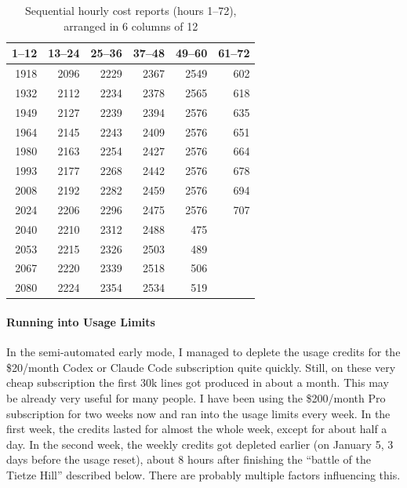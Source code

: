 \documentclass[a4paper,UKenglish,cleveref, autoref, thm-restate]{lipics-v2021}
\begin{document}
%

\begin{table}[h]
\centering
\small
\setlength{\tabcolsep}{4pt}
\begin{tabular}{rrrrrr}
\toprule
1--12 & 13--24 & 25--36 & 37--48 & 49--60 & 61--72 \\
\midrule
1918 & 2096 & 2229 & 2367 & 2549 & 602 \\
1932 & 2112 & 2234 & 2378 & 2565 & 618 \\
1949 & 2127 & 2239 & 2394 & 2576 & 635 \\
1964 & 2145 & 2243 & 2409 & 2576 & 651 \\
1980 & 2163 & 2254 & 2427 & 2576 & 664 \\
1993 & 2177 & 2268 & 2442 & 2576 & 678 \\
2008 & 2192 & 2282 & 2459 & 2576 & 694 \\
2024 & 2206 & 2296 & 2475 & 2576 & 707 \\
2040 & 2210 & 2312 & 2488 & 475  &      \\
2053 & 2215 & 2326 & 2503 & 489  &      \\
2067 & 2220 & 2339 & 2518 & 506  &      \\
2080 & 2224 & 2354 & 2534 & 519  &      \\
\bottomrule
\end{tabular}
\caption{Sequential hourly cost reports (hours 1--72), arranged in 6 columns of 12\label{tab:costs}}
\end{table}

\paragraph*{Running into Usage Limits}
In the semi-automated early mode, I managed to deplete the usage credits
for the \$20/month Codex or Claude Code subscription quite quickly. Still, on
these very cheap subscription the first 30k lines got produced in about a
month. This may be already very useful for many people.
I have been using the \$200/month Pro subscription for two weeks now and ran
into the usage limits every week. In the first week, the credits lasted for
almost the whole week, except for about half a day. In the second week, the weekly
credits got depleted earlier (on January 5, 3 days before the usage reset),
about 8 hours after finishing the ``battle of the Tietze Hill'' described
below. There are probably multiple factors influencing this.
\end{document}
